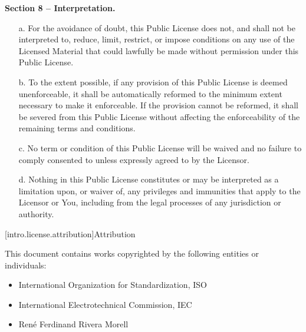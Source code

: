 \textbf{Section 8 -- Interpretation.}

\begin{enumerate}

	\item[a.] For the avoidance of doubt, this Public License does not, and
	shall not be interpreted to, reduce, limit, restrict, or impose
	conditions on any use of the Licensed Material that could lawfully
	be made without permission under this Public License.

	\item[b.] To the extent possible, if any provision of this Public License is
	deemed unenforceable, it shall be automatically reformed to the
	minimum extent necessary to make it enforceable. If the provision
	cannot be reformed, it shall be severed from this Public License
	without affecting the enforceability of the remaining terms and
	conditions.

	\item[c.] No term or condition of this Public License will be waived and no
	failure to comply consented to unless expressly agreed to by the
	Licensor.

	\item[d.] Nothing in this Public License constitutes or may be interpreted
	as a limitation upon, or waiver of, any privileges and immunities
	that apply to the Licensor or You, including from the legal
	processes of any jurisdiction or authority.

\end{enumerate}


[intro.license.attribution]{Attribution}

This document contains works copyrighted by the following entities or
individuals:

\begin{itemize}
	\item International Organization for Standardization, ISO
	\item International Electrotechnical Commission, IEC
	\item René Ferdinand Rivera Morell
\end{itemize}
